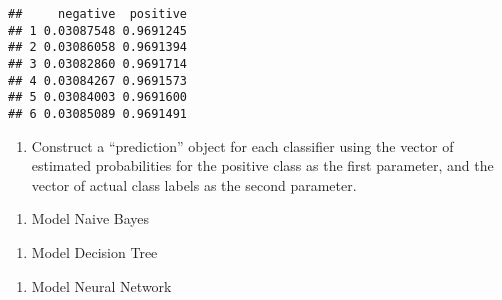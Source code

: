 \documentclass[]{article}
\newenvironment{Shaded}{\begin{snugshade}}{\end{snugshade}}
\newcommand{\KeywordTok}[1]{\textcolor[rgb]{0.13,0.29,0.53}{\textbf{#1}}}
\newcommand{\NormalTok}[1]{#1}
\newcommand{\OperatorTok}[1]{\textcolor[rgb]{0.81,0.36,0.00}{\textbf{#1}}}
\newcommand{\StringTok}[1]{\textcolor[rgb]{0.31,0.60,0.02}{#1}}
\providecommand{\tightlist}{%
  \setlength{\itemsep}{0pt}\setlength{\parskip}{0pt}}
\begin{document}
\begin{verbatim}
##     negative  positive
## 1 0.03087548 0.9691245
## 2 0.03086058 0.9691394
## 3 0.03082860 0.9691714
## 4 0.03084267 0.9691573
## 5 0.03084003 0.9691600
## 6 0.03085089 0.9691491
\end{verbatim}

\begin{enumerate}
\def\labelenumi{\alph{enumi})}
\setcounter{enumi}{1}
\tightlist
\item
  Construct a ``prediction'' object for each classifier using the vector
  of estimated probabilities for the positive class as the first
  parameter, and the vector of actual class labels as the second
  parameter.
\end{enumerate}

\begin{enumerate}
\def\labelenumi{\arabic{enumi}.}
\tightlist
\item
  Model Naive Bayes
\end{enumerate}

\begin{Shaded}
\end{Shaded}

\begin{enumerate}
\def\labelenumi{\arabic{enumi}.}
\setcounter{enumi}{1}
\tightlist
\item
  Model Decision Tree
\end{enumerate}

\begin{Shaded}
\end{Shaded}

\begin{enumerate}
\def\labelenumi{\arabic{enumi}.}
\setcounter{enumi}{2}
\tightlist
\item
  Model Neural Network
\end{enumerate}

\begin{Shaded}
\end{Shaded}
\end{document}
